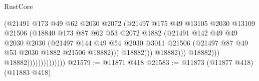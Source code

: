 \begin{lexlean}{RustCore}
\begin{coremodule}
                                            (@21491
                                              @173
                                              @49
                                              @62
                                              @2030
                                              @2072
                                              (@21497
                                                @175
                                                @49
                                                @13105
                                                @2030
                                                @13109
                                                @21506
                                                (@18840
                                                  @173
                                                  @87
                                                  @62
                                                  @53
                                                  @2072
                                                  @1882
                                                  (@21491
                                                    @142
                                                    @49
                                                    @49
                                                    @2030
                                                    @2030
                                                    (@21497
                                                      @144
                                                      @49
                                                      @54
                                                      @2030
                                                      @3011
                                                      @21506
                                                      (@21497
                                                        @87
                                                        @49
                                                        @53
                                                        @2030
                                                        @1882
                                                        @21506
                                                        @18882)))
                                                  @18882)))
                                            @18882)))
                                      @18882)))
                                @18882))))))))))))))
@21579 := @11871 @418
@21583 := @11873 (@11877 @418) (@11883 @418)

\end{coremodule}
\end{lexlean}
